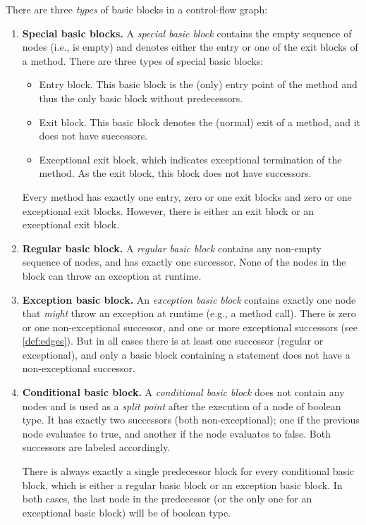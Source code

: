 \begin{definition}
    There are three \emph{types} of basic blocks in a control-flow graph:
    \begin{enumerate}
        \item \textbf{Special basic blocks.} A \emph{special basic block} contains
        the empty sequence of nodes (i.e., is empty) and denotes either the
        entry or one of the exit blocks of a method. There are three types
        of special basic blocks:
        \begin{itemize}
            \item Entry block. This basic block is the (only) entry point of the
            method and thus the only basic block without predecessors.
            \item Exit block. This basic block denotes the (normal) exit of
            a method, and it does not have successors.
            \item Exceptional exit block, which indicates exceptional termination
            of the method. As the exit block, this block does not have successors.
        \end{itemize}
        Every method has exactly one entry, zero or one exit blocks and zero or one
        exceptional exit blocks. However, there is either an exit block or an exceptional
        exit block.
        \item \textbf{Regular basic block.} A \emph{regular basic block} contains
        any non-empty sequence of nodes, and has exactly one successor.
        None of the nodes in the block can throw an exception at runtime.
        \item \textbf{Exception basic block.} An \emph{exception basic block} contains exactly
        one node that \emph{might} throw an exception at runtime (e.g., a method call).
        There is zero or one non-exceptional successor, and one
        or more exceptional successors (see \autoref{def:edges}). But in all cases there
        is at least one successor (regular or exceptional), and only a basic block
        containing a  statement does not have a non-exceptional successor.
        \item \textbf{Conditional basic block.} A \emph{conditional basic block}
        does not contain any nodes and is used as a \emph{split point} after the execution
        of a node of boolean type. It has exactly two successors (both non-exceptional); one
        if the previous node evaluates to true, and another
        if the node evaluates to false. Both successors are labeled accordingly.
        
        There is always exactly a single predecessor block for every conditional basic block, which
        is either a regular basic block or an exception basic block. In both cases, the last node
        in the predecessor (or the only one for an exceptional basic block) will be of boolean type.
    \end{enumerate}
\end{definition}

